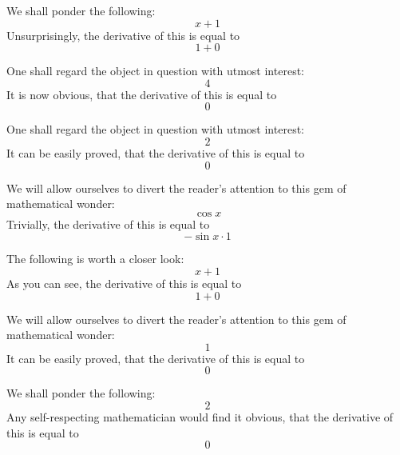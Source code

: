 \documentclass{article}
\begin{document}
We shall ponder the following:
\begin{equation}
x + 1 
\end{equation}
Unsurprisingly, the derivative of this is equal to
\begin{equation}
1 + 0 
\end{equation}

One shall regard the object in question with utmost interest:
\begin{equation}
4 
\end{equation}
It is now obvious, that the derivative of this is equal to
\begin{equation}
0 
\end{equation}

One shall regard the object in question with utmost interest:
\begin{equation}
2 
\end{equation}
It can be easily proved, that the derivative of this is equal to
\begin{equation}
0 
\end{equation}

We will allow ourselves to divert the reader's attention to this gem of mathematical wonder:
\begin{equation}
\cos x 
\end{equation}
Trivially, the derivative of this is equal to
\begin{equation}
-\sin x \cdot 1 
\end{equation}

The following is worth a closer look:
\begin{equation}
x + 1 
\end{equation}
As you can see, the derivative of this is equal to
\begin{equation}
1 + 0 
\end{equation}

We will allow ourselves to divert the reader's attention to this gem of mathematical wonder:
\begin{equation}
1 
\end{equation}
It can be easily proved, that the derivative of this is equal to
\begin{equation}
0 
\end{equation}

We shall ponder the following:
\begin{equation}
2 
\end{equation}
Any self-respecting mathematician would find it obvious, that the derivative of this is equal to
\begin{equation}
0 
\end{equation}
\end{document}
